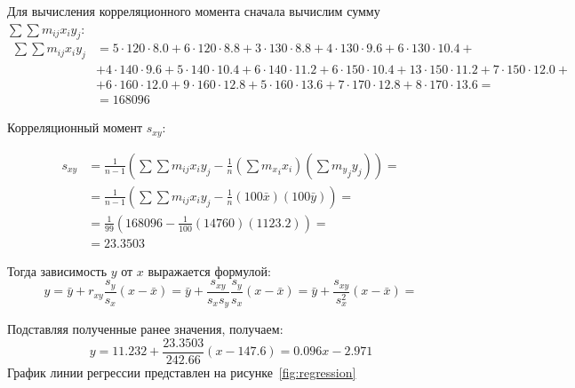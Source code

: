 \documentclass{article}
\theoremstyle{problemstyle}
\begin{document}
Для вычисления корреляционного момента сначала вычислим сумму $ \sum \sum m_{ij} x_i y_j $:
\begin{align*}
	\sum \sum m_{ij} x_i y_j & = 5 \cdot 120 \cdot 8.0 + 6 \cdot 120 \cdot 8.8 +
	3 \cdot 130 \cdot 8.8 + 4 \cdot 130 \cdot 9.6 + 6 \cdot 130 \cdot 10.4    +                              \\
	                         & + 4 \cdot 140 \cdot 9.6 + 5 \cdot 140 \cdot 10.4 + 6 \cdot 140 \cdot 11.2 +
	6 \cdot 150 \cdot 10.4 + 13 \cdot 150 \cdot 11.2 + 7 \cdot 150 \cdot 12.0 +                              \\
	                         & + 6 \cdot 160 \cdot 12.0 + 9 \cdot 160 \cdot 12.8 + 5 \cdot 160 \cdot 13.6  +
	7 \cdot 170 \cdot 12.8 + 8 \cdot 170 \cdot 13.6 =                                                        \\
	                         & = 168096
\end{align*}

Корреляционный момент $s_{xy}$:


\begin{align*}
	s_{xy} & =
	\frac{1}{n-1} \left( \sum \sum m_{ij} x_i y_j - \frac{1}{n} \left(\sum {m_x}_i x_i \right)\left(\sum {m_y}_j y_j \right) \right) = \\
	       & = \frac{1}{n-1} \left( \sum \sum m_{ij} x_i y_j - \frac{1}{n} (100 \bar x) (100 \bar y) \right) =                         \\
	       & = \frac{1}{99} \left( 168096 - \frac{1}{100} (14760) (1123.2) \right) =                                                   \\
	       & = 23.3503
\end{align*}

Тогда зависимость $y$ от $x$ выражается формулой:
\[
	y =
	\bar y + r_{xy} \frac{s_y}{s_x} (x - \bar x) =
	\bar y + \frac{s_{xy}}{s_x s_y} \frac{s_y}{s_x} (x - \bar x) =
	\bar y + \frac{s_{xy}}{s_x^2} (x - \bar x) =
\]

Подставляя полученные ранее значения, получаем:
\[
	y = 11.232 + \frac{23.3503}{242.66} (x - 147.6) =
	0.096 x - 2.971
\]
График линии регрессии представлен на рисунке~\ref{fig:regression}
\end{document}
